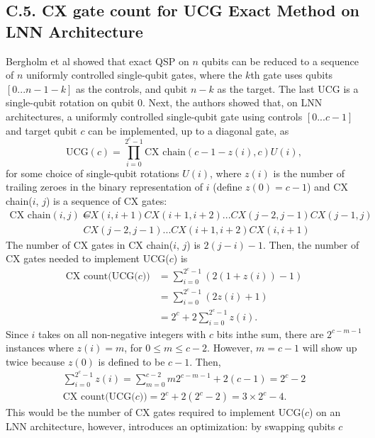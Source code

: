 \subsection*{C.5. CX gate count for UCG Exact Method on LNN Architecture}
Bergholm et al \cite{bergholm2005quantum} showed that exact QSP on $n$ qubits can be reduced to a
sequence of $n$ uniformly controlled single-qubit gates, where the $k$th gate
uses qubits $[0...n-1-k]$ as the controls, and qubit $n-k$ as the target. 
The last UCG is a single-qubit rotation on qubit 0. Next, the authors showed
that, on LNN architectures, a uniformly controlled single-qubit gate using
controls $[0...c-1]$ and target qubit $c$ can be implemented, up to a diagonal
gate, as
\begin{equation}
\text{UCG}(c) = \prod_{i = 0}^{2^c - 1}{\text{CX chain}(c - 1 - z(i), c)U(i)},
\label{UCGdef}
\end{equation}
for some choice of single-qubit rotations $U(i)$, where $z(i)$ is the number of
trailing zeroes in the binary representation of $i$ (define $z(0) = c - 1$)
and CX chain($i$, $j$) is a sequence of CX gates:
\begin{align}
\text{CX chain}(i, j) = &CX(i, i + 1)CX(i + 1, i + 2)...CX(j - 2, j - 1)
CX(j - 1, j) \nonumber \\
&CX(j - 2, j - 1)...CX(i + 1, i + 2)CX(i, i + 1)
\end{align}
The number of CX gates in CX chain($i$, $j$) is $2(j - i) - 1$. Then, the number
of CX gates needed to implement UCG($c$) is
\begin{align}
\text{CX count(UCG($c$))} &= \sum_{i = 0}^{2^c - 1}{(2(1 + z(i)) - 1)} \nonumber \\
&=\sum_{i = 0}^{2^c - 1}{(2z(i) + 1)} \nonumber \\
&=2^c + 2\sum_{i = 0}^{2^c - 1}{z(i)}.
\end{align}
Since $i$ takes on all non-negative integers with $c$ bits inthe sum, there are
$2^{c-m-1}$ instances where $z(i) = m$, for $0 \leq m \leq c - 2$. However, 
$m = c - 1$ will show up twice because $z(0)$ is defined to be $c - 1$. Then,
\begin{align}
\sum_{i = 0}^{2^c - 1}{z(i)} = \sum_{m = 0}^{c - 2}{m2^{c - m - 1} + 2(c - 1)} 
= 2^c - 2 \nonumber \\
\text{CX count(UCG($c$))} = 2^c + 2(2^c - 2) = 3 \times 2^c - 4.
\end{align}
This would be the number of CX gates required to implement UCG($c$) on an LNN
architecture, however, \cite{bergholm2005quantum} introduces an optimization: by swapping qubits $c$

